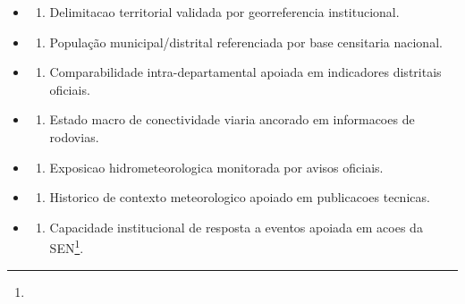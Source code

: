 {\begin{itemize}
\tightlist
\item
  \begin{enumerate}
  \def\labelenumi{\arabic{enumi})}
  \tightlist
  \item
    Delimitacao territorial validada por georreferencia institucional.
  \end{enumerate}
\item
  \begin{enumerate}
  \def\labelenumi{\arabic{enumi})}
  \setcounter{enumi}{1}
  \tightlist
  \item
    População municipal/\allowbreak \allowbreak distrital referenciada por base censitaria
    nacional.
  \end{enumerate}
\item
  \begin{enumerate}
  \def\labelenumi{\arabic{enumi})}
  \setcounter{enumi}{2}
  \tightlist
  \item
    Comparabilidade intra-departamental apoiada em indicadores
    distritais oficiais.
  \end{enumerate}
\item
  \begin{enumerate}
  \def\labelenumi{\arabic{enumi})}
  \setcounter{enumi}{3}
  \tightlist
  \item
    Estado macro de conectividade viaria ancorado em informacoes de
    rodovias.
  \end{enumerate}
\item
  \begin{enumerate}
  \def\labelenumi{\arabic{enumi})}
  \setcounter{enumi}{4}
  \tightlist
  \item
    Exposicao hidrometeorologica monitorada por avisos oficiais.
  \end{enumerate}
\item
  \begin{enumerate}
  \def\labelenumi{\arabic{enumi})}
  \setcounter{enumi}{5}
  \tightlist
  \item
    Historico de contexto meteorologico apoiado em publicacoes tecnicas.
  \end{enumerate}
\item
  \begin{enumerate}
  \def\labelenumi{\arabic{enumi})}
  \setcounter{enumi}{6}
  \tightlist
  \item
    Capacidade institucional de resposta a eventos apoiada em acoes da
    SEN\footnote{\fineSEN}.
  \end{enumerate}

\end{itemize}}
